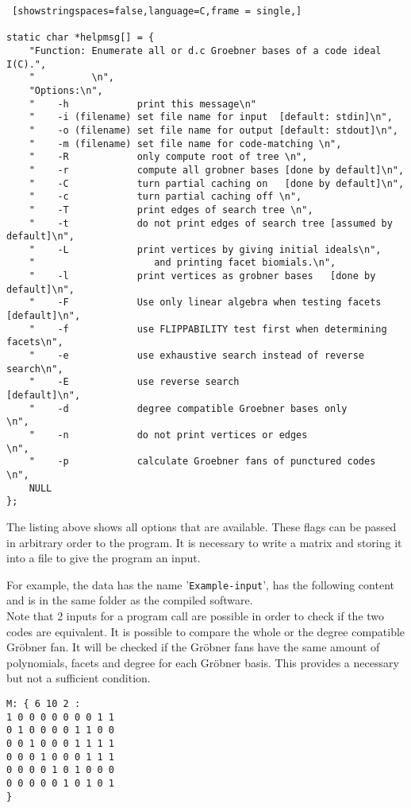 \begin{lstlisting} [showstringspaces=false,language=C,frame = single,]

static char *helpmsg[] = {
    "Function: Enumerate all or d.c Groebner bases of a code ideal I(C).",
    "          \n",
    "Options:\n",
    "    -h            print this message\n"
    "    -i (filename) set file name for input  [default: stdin]\n",
    "    -o (filename) set file name for output [default: stdout]\n",
    "    -m (filename) set file name for code-matching \n",
    "    -R            only compute root of tree \n",
    "    -r            compute all grobner bases [done by default]\n",
    "    -C            turn partial caching on   [done by default]\n",
    "    -c            turn partial caching off \n",
    "    -T            print edges of search tree \n",
    "    -t            do not print edges of search tree [assumed by default]\n",  
    "    -L            print vertices by giving initial ideals\n",
    "                     and printing facet biomials.\n",
    "    -l            print vertices as grobner bases   [done by default]\n",
    "    -F            Use only linear algebra when testing facets [default]\n",
    "    -f            use FLIPPABILITY test first when determining facets\n",
    "    -e            use exhaustive search instead of reverse search\n",
    "    -E            use reverse search                   [default]\n",
    "    -d            degree compatible Groebner bases only         \n",
    "    -n            do not print vertices or edges                \n",
    "    -p            calculate Groebner fans of punctured codes    \n",
    NULL
};

\end{lstlisting}

The listing above shows all options that are available. These flags can be passed in arbitrary order to the program. It is necessary to write a matrix and storing it into a file to give the program an input.

For example, the data has the name '\texttt{Example-input}', has the following content and is in the same folder as the compiled software.\\
Note that 2 inputs for a program call are possible in order to check if the two codes are equivalent. It is possible to compare the whole or the degree compatible Gröbner fan. It will be checked if the Gröbner fans have the same amount of polynomials, facets and degree for each Gröbner basis. This provides a necessary but not a sufficient condition.
\begin{lstlisting}[basicstyle=\fontfamily{courier}\selectfont]
M: { 6 10 2 :
1 0 0 0 0 0 0 0 1 1 
0 1 0 0 0 0 1 1 0 0 
0 0 1 0 0 0 1 1 1 1 
0 0 0 1 0 0 0 1 1 1 
0 0 0 0 1 0 1 0 0 0 
0 0 0 0 0 1 0 1 0 1 
}
\end{lstlisting}

